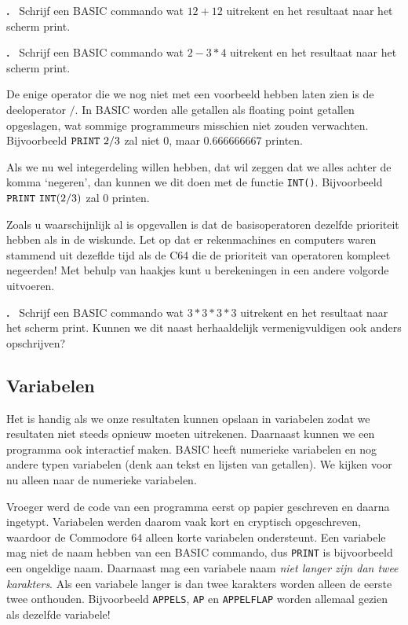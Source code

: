 \documentclass{article}
\newcounter{problem}
\newcounter{solution}
\newcommand\problem{%
  \stepcounter{problem}%
  \textbf{\theproblem.}~%
  \setcounter{solution}{0}%
}
\begin{document}
\problem Schrijf een BASIC commando wat $12 + 12$ uitrekent en het resultaat naar het scherm print.

\problem Schrijf een BASIC commando wat $2 - 3 * 4$ uitrekent en het resultaat naar het scherm print.

De enige operator die we nog niet met een voorbeeld hebben laten zien is de deeloperator $/$.
In BASIC worden alle getallen als floating point getallen opgeslagen, wat sommige programmeurs misschien niet zouden verwachten.
Bijvoorbeeld $\verb:PRINT:\ 2/3$ zal niet $0$, maar $0.666666667$ printen.

Als we nu wel integerdeling willen hebben, dat wil zeggen dat we alles achter de komma `negeren',
dan kunnen we dit doen met de functie \verb:INT():.
Bijvoorbeeld $\verb:PRINT:\ \verb:INT:(2/3)$ zal $0$ printen.

Zoals u waarschijnlijk al is opgevallen is dat de basisoperatoren dezelfde prioriteit hebben als in de wiskunde.
Let op dat er rekenmachines en computers waren stammend uit dezeflde tijd als de C64 die de prioriteit van operatoren kompleet negeerden!
Met behulp van haakjes kunt u berekeningen in een andere volgorde uitvoeren.

\problem Schrijf een BASIC commando wat $3*3*3*3$ uitrekent en het resultaat naar het scherm print.
Kunnen we dit naast herhaaldelijk vermenigvuldigen ook anders opschrijven?

\subsection{Variabelen}

Het is handig als we onze resultaten kunnen opslaan in variabelen zodat we resultaten niet steeds opnieuw moeten uitrekenen.
Daarnaast kunnen we een programma ook interactief maken.
BASIC heeft numerieke variabelen en nog andere typen variabelen (denk aan tekst en lijsten van getallen).
We kijken voor nu alleen naar de numerieke variabelen.

Vroeger werd de code van een programma eerst op papier geschreven en daarna ingetypt.
Variabelen werden daarom vaak kort en cryptisch opgeschreven, waardoor de Commodore 64 alleen korte variabelen ondersteunt.
Een variabele mag niet de naam hebben van een BASIC commando, dus \verb:PRINT: is bijvoorbeeld een ongeldige naam.
Daarnaast mag een variabele naam \emph{niet langer zijn dan twee karakters}.
Als een variabele langer is dan twee karakters worden alleen de eerste twee onthouden.
Bijvoorbeeld \verb:APPELS:, \verb:AP: en \verb:APPELFLAP: worden allemaal gezien als dezelfde variabele!
\end{document}
